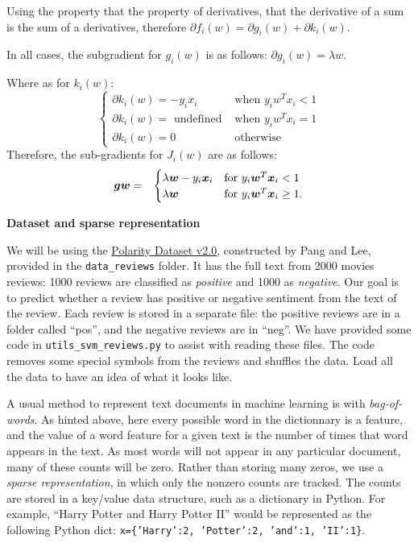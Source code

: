 \documentclass{article}
\newcommand{\wipcom}[1]{\textcolor{red}{WIP: #1}}
\newcommand{\nyuparagrah}[1]{\textcolor{nyupurple}{\large #1}}
\newcommand{\code}[1]{\texttt{#1}}
\theoremstyle{plain}
\theoremstyle{definition}
\begin{document}
Using the property that the property of derivatives, that the derivative of a sum is the sum of a derivatives, therefore $\partial f_i(w)=\partial g_i(w)+\partial k_i(w)$. 

In all cases, the subgradient for $g_i(w)$ is as follows: $\partial g_i(w) = \lambda w$.

Where as for $k_i(w)$:
$$
    \begin{cases}
    \partial k_i(w) = -y_ix_i & \text{when } y_iw^Tx_i < 1 \\
    \partial k_i(w) = \text{ undefined } & \text{when } y_iw^Tx_i = 1 \\
    \partial k_i(w) = 0 & \text{otherwise}
    \end{cases}
$$
Therefore, the sub-gradients for $J_i(w)$ are as follows:
\begin{eqnarray*}
\boldsymbol{g}{\boldsymbol{w}} & = & \begin{cases}
\lambda \boldsymbol{w}-y_{i}\boldsymbol{x}_{i} & \mbox{for }y_{i}\boldsymbol{w}^{T}\boldsymbol{x}_{i}<1\\
\lambda \boldsymbol{w} & \mbox{for }y_{i}\boldsymbol{w}^{T}\boldsymbol{x}_{i}\ge1.
\end{cases}
\end{eqnarray*}

\nyuparagrah{\bf Dataset and sparse representation} 

We will be using the \href{https://www.cs.cornell.edu/people/pabo/movie-review-data/}{Polarity Dataset v2.0},
constructed by Pang and Lee, provided in the \texttt{data\_reviews} folder. It has the full text from 2000 movies
reviews: 1000 reviews are classified as \emph{positive} and 1000 as
\emph{negative}. Our goal is to predict whether a review has positive
or negative sentiment from the text of the review. Each review is
stored in a separate file: the positive reviews are in a folder called
``pos'', and the negative reviews are in ``neg''. We have provided
some code in \texttt{utils\_svm\_reviews.py} to assist with reading these files.
The code removes
some special symbols from the reviews and shuffles the data.
Load all the data to have an idea of what it looks like.

A usual method to represent text documents in machine learning
is with \emph{bag-of-words}. As hinted above, here every possible word in the dictionnary
is a feature, and the value of a word feature for a given text is the number of times that word appears in the text. As most words will not
appear in any particular document, many of these counts will be zero.
Rather than storing many zeros, we use a \emph{sparse representation},
in which only the nonzero counts are tracked. The counts are
stored in a key/value data structure, such as a dictionary in Python. For
example, ``Harry Potter and Harry Potter II'' would be represented
as the following Python dict: \code{x=\{'Harry':2, 'Potter':2, 'and':1, 'II':1\}}.
\end{document}
